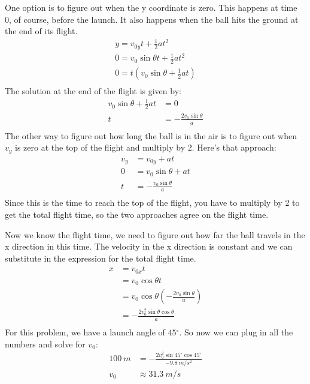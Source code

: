 \documentclass[fleqn,addpoints]{exam}
\newcommand{\degree}{\ensuremath{^\circ}}
\begin{document}
\begin{questions}
\begin{solution}
One option is to figure out when the y coordinate is zero.  This happens at time 0, of course, before the launch.  It
also happens when the ball hits the ground at the end of its flight.
\begin{align*}
  y = v_{0y} t + \frac{1}{2} at^2 \\
  0 = v_0 \sin \theta t + \frac{1}{2} at^2 \\
  0 = t \left( v_0 \sin \theta + \frac{1}{2} at \right) \\
\end{align*}
The solution at the end of the flight is given by:
\begin{align*}
  v_0 \sin \theta + \frac{1}{2} at &= 0 \\
  t &= - \frac{2 v_0 \sin \theta}{a} \\
\end{align*}
The other way to figure out how long the ball is in the air is to figure out when $v_y$ is zero at the top of the
flight and multiply by 2.  Here's that approach:
\begin{align*}
  v_y &= v_{0y} + at \\
  0 &= v_0 \sin \theta + at \\
  t &= - \frac{v_0 \sin \theta}{a} \\
\end{align*}
Since this is the time to reach the top of the flight, you have to multiply by 2 to get the total flight time, so the
two approaches agree on the flight time.

Now we know the flight time, we need to figure out how far the ball travels in the x direction in this time.  The
velocity in the x direction is constant and we can substitute in the expression for the total flight time.
\begin{align*}
  x &= v_{0x}t \\
   &= v_0 \cos \theta t \\
   &= v_0 \cos \theta \left( - \frac{2 v_0 \sin \theta}{a} \right) \\
   &= - \frac{2 v_0^2 \sin \theta \cos \theta}{a} \\
\end{align*}
For this problem, we have a launch angle of $45 \degree$.  So now we can plug in all the numbers and solve for $v_0$:
\begin{align*}
   100 \ m &= - \frac{2 v_0^2 \sin 45 \degree \cos 45 \degree}{-9.8 \ m/s^2} \\
   v_0 &\approx 31.3 \ m/s
\end{align*}


\end{solution}
\end{questions}
\end{document}

